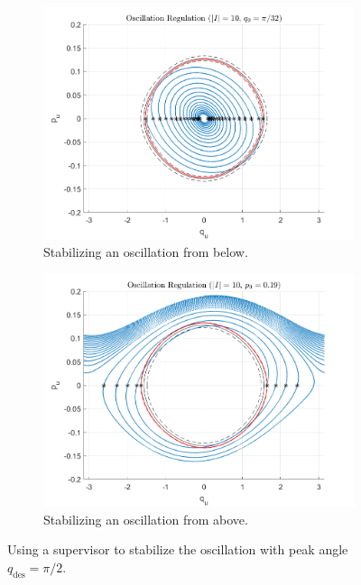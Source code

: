 \documentclass[journal,twoside,web]{ieeecolor}
\begin{document}
\begin{figure}
    \centering
    \begin{subfigure}[t]{0.49\linewidth}
        \includegraphics[width=\linewidth]{acrobot_osc_orbit_1.png}
        \caption{Stabilizing an oscillation from below.}
        \label{fig:acrobot-osc-reg-in}
    \end{subfigure}
    \begin{subfigure}[t]{0.49\linewidth}
        \includegraphics[width=\linewidth]{acrobot_osc_orbit_2.png}
        \caption{Stabilizing an oscillation from above.}
        \label{fig:acrobot-osc-reg-diss}
    \end{subfigure}
    \caption{Using a supervisor to stabilize the oscillation with peak angle
    \(q_\text{des} = \pi/2\).}
    \label{fig:acrobot-osc-reg}
\end{figure}
\end{document}
